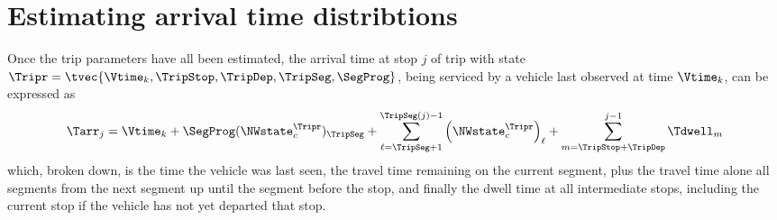 \section{Estimating arrival time distribtions}
\label{sec:trip_etas}

Once the trip parameters have all been estimated,
the arrival time at stop $j$ of trip with state
$\Tripr = \tvec{\Vtime_k, \TripStop, \TripDep, \TripSeg, \SegProg}$,
being serviced by a vehicle last observed at time $\Vtime_k$,
can be expressed as
\begin{equation}
\label{eq:trip_eta}
\Tarr_j =
\Vtime_k +
\SegProg (\NWstate^\Tripr_c)_\TripSeg +
\sum_{\ell=\TripSeg+1}^{\TripSeg(j)-1}
    \left(\NWstate^\Tripr_c\right)_\ell +
\sum_{m=\TripStop + \TripDep}^{j-1} \Tdwell_m
\end{equation}
which, broken down,
is the time the vehicle was last seen,
the travel time remaining on the current segment,
plus the travel time alone all segments from
the next segment up until the segment before the stop,
and finally the dwell time at all intermediate stops,
including the current stop if the vehicle has not yet
departed that stop.



